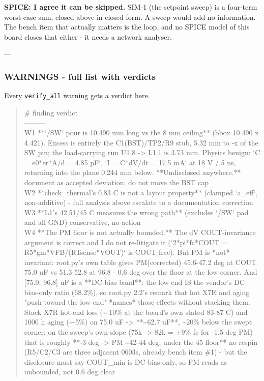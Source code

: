 \documentclass[11pt,a4paper]{article}
\begin{document}
\textbf{SPICE: I agree it can be skipped.} SIM-1 (the setpoint sweep) is a four-term worst-case sum, closed above in closed form. A sweep would add no information. The bench item that actually matters is the loop, and no SPICE model of this board closes that either - it needs a network analyser.

---

\subsubsection*{WARNINGS - full list with verdicts}
Every \texttt{verify\_all} warning gets a verdict here.

\begin{quote}\small\ttfamily\raggedright
\textbar{} \# \textbar{} finding \textbar{} verdict \textbar{}\\
\textbar{}---\textbar{}---\textbar{}---\textbar{}\\
\textbar{} W1 \textbar{} {*}{*}`/SW` pour is 10.490 mm long vs the 8 mm ceiling{*}{*} (bbox 10.490 x 4.421). Excess is entirely the C1(BST)/TP2/R9 stub, 5.32 mm to -x of the SW pin; the load-carrying run U1.8 -\textgreater{} L1.1 is 3.73 mm. Physics benign: `C = e0{*}er{*}A/d = 4.85 pF`, `I = C{*}dV/dt = 17.5 mA` at 18 V / 5 ns, returning into the plane 0.244 mm below. {*}{*}Undisclosed anywhere.{*}{*} \textbar{} document as accepted deviation; do not move the BST cap \textbar{}\\
\textbar{} W2 \textbar{} {*}{*}check\_thermal's 0.83 C is not a layout property{*}{*} (clamped `a\_eff`, non-additive) - full analysis above \textbar{} escalate to a documentation correction \textbar{}\\
\textbar{} W3 \textbar{} {*}{*}L1's 42.51/45 C measures the wrong path{*}{*} (excludes `/SW` pad and all GND) \textbar{} conservative, no action \textbar{}\\
\textbar{} W4 \textbar{} {*}{*}The PM floor is not actually bounded.{*}{*} The dV COUT-invariance argument is correct and I do not re-litigate it (`2{*}pi{*}fc{*}COUT = R5{*}gm{*}VFB/(RTsense{*}VOUT)` is COUT-free). But PM is {*}not{*} invariant: root.py's own table gives PM(corrected) 45.6-47.2 deg at COUT 75.0 uF vs 51.3-52.8 at 96.8 - 0.6 deg over the floor at the low corner. And {[}75.0, 96.8{]} uF is a {*}{*}DC-bias band{*}{*}: the low end IS the vendor's DC-bias-only ratio (68.2\%), so root.py 2.2's remark that hot X7R and aging "push toward the low end" {*}names{*} those effects without stacking them. Stack X7R hot-end loss (\textasciitilde{}-10\% at the board's own stated 83-87 C) and 1000 h aging (\textasciitilde{}-5\%) on 75.0 uF -\textgreater{} {*}{*}\textasciitilde{}62.7 uF{*}{*}, \textasciitilde{}20\% below the swept corner; on the sweep's own slope (75k -\textgreater{} 82k = +9\% fc for -1.5 deg PM) that is roughly {*}{*}-3 deg -\textgreater{} PM \textasciitilde{}42-44 deg, under the 45 floor{*}{*} \textbar{} no respin (R5/C2/C3 are three adjacent 0603s, already bench item \#1) - but the disclosure must say COUT\_min is DC-bias-only, so PM reads as unbounded, not 0.6 deg clear \textbar{}\\

\end{quote}
\end{document}

